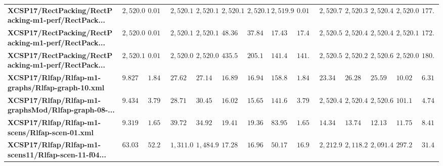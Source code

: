 \begin{tabular}{llllllllllllll}
\textbf{XCSP17/RectPacking/RectPacking-m1-perf/RectPack...} &        $2,520.03$ &   $0.013432$ &     $2,520.1$ &      $2,520.11$ &                                 $2,520.12$ &                               $2,520.1$ &          $2,519.95$ &  $0.013432$ &              $2,520.73$ &              $2,520.32$ &              $2,520.44$ &              $2,520.04$ &   $177.196$ \\
\textbf{XCSP17/RectPacking/RectPacking-m1-perf/RectPack...} &        $2,520.08$ &   $0.013633$ &    $2,520.11$ &      $2,520.13$ &                                  $48.3671$ &                               $37.8423$ &           $17.4392$ &   $17.4392$ &              $2,520.57$ &              $2,520.42$ &              $2,520.44$ &              $2,520.13$ &   $172.099$ \\
\textbf{XCSP17/RectPacking/RectPacking-m1-perf/RectPack...} &        $2,520.11$ &   $0.013684$ &    $2,520.06$ &      $2,520.07$ &                                  $435.502$ &                                $205.19$ &           $141.487$ &   $141.487$ &              $2,520.55$ &              $2,520.29$ &              $2,520.61$ &              $2,520.08$ &   $180.694$ \\
\textbf{XCSP17/Rlfap/Rlfap-m1-graphs/Rlfap-graph-10.xml   } &         $9.82721$ &    $1.84245$ &     $27.6229$ &       $27.1459$ &                                  $16.8914$ &                               $16.9428$ &           $158.833$ &   $1.84245$ &               $23.3459$ &               $26.2889$ &               $25.5954$ &               $10.0292$ &   $6.31495$ \\
\textbf{XCSP17/Rlfap/Rlfap-m1-graphsMod/Rlfap-graph-08-...} &          $9.4344$ &    $3.79454$ &     $28.7199$ &       $30.4548$ &                                  $16.0239$ &                               $15.6577$ &           $141.655$ &   $3.79454$ &              $2,520.43$ &              $2,520.42$ &              $2,520.65$ &               $101.196$ &   $4.74543$ \\
\textbf{XCSP17/Rlfap/Rlfap-m1-scens/Rlfap-scen-01.xml     } &         $9.31975$ &    $1.65005$ &     $39.7297$ &       $34.9287$ &                                  $19.4187$ &                               $19.3636$ &           $83.9503$ &   $1.65005$ &               $14.3442$ &               $13.7498$ &                $12.139$ &               $11.7533$ &   $8.41506$ \\
\textbf{XCSP17/Rlfap/Rlfap-m1-scens11/Rlfap-scen-11-f04...} &         $63.0356$ &     $52.233$ &    $1,311.07$ &      $1,484.95$ &                                  $17.2812$ &                               $16.9607$ &            $50.173$ &   $16.9607$ &              $2,212.98$ &              $2,118.27$ &              $2,091.45$ &               $297.204$ &   $31.4444$ \\

\end{tabular}
